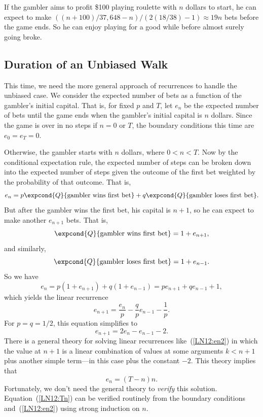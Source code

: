 \begin{example}
\begin{example}
If the gambler aims to profit \$100 playing roulette with $n$ dollars to
start, he can expect to make $((n+100)/37,648 - n)/(2(18/38) - 1) \approx
19n$ bets before the game ends.  So he can enjoy playing for a good while
before almost surely going broke.
\end{example}


\subsection{Duration of an Unbiased Walk}

This time, we need the more general approach of recurrences to handle the
unbiased case.  We consider the expected number of bets as a
function of the gambler's initial capital.  That is, for fixed $p$ and $T$,
let $e_n$ be the expected number of bets until the game ends when the
gambler's initial capital is $n$ dollars.  Since the game is over in no
steps if $n=0$ or $T$, the boundary conditions this time are $e_0=e_T=0$.

Otherwise, the gambler starts with $n$ dollars, where $0 < n < T$.
Now by the conditional expectation rule, the expected number of steps can
be broken down into the expected number of steps given the outcome of the
first bet weighted by the probability of that outcome.  That is,
\[
e_n = p\expcond{Q}{\text{gambler wins first bet}} +
q\expcond{Q}{\text{gambler loses first bet}}.
\]
But after the gambler wins the first bet, his capital is $n+1$, so
he can expect to make another $e_{n+1}$ bets.  That is,
\[
\expcond{Q}{\text{gambler wins first bet}} = 1 + e_{n+1},
\]
and similarly, 
\[
\expcond{Q}{\text{gambler loses first bet}} = 1 + e_{n-1}.
\]
So we have
\[
e_n =  p(1 + e_{n+1}) +  q(1 + e_{n-1}) =  pe_{n+1} + qe_{n-1} + 1, 
\]
which yields the linear recurrence
\[
e_{n+1} = \frac{e_n}{p} - \frac{q}{p} e_{n-1} - \frac{1}{p}.
\]
For $p = q = 1/2$, this equation simplifies to
\begin{equation}\label{LN12:en2}
e_{n+1} = 2e_n - e_{n-1} - 2.
\end{equation}
There is a general theory for solving linear recurrences like~(\ref{LN12:en2})
in which the value at $n+1$ is a linear combination of values at some
arguments $k<n+1$ plus another simple term---in this case plus the constant
$-2$.  This theory implies that
\begin{equation}\label{LN12:Tn}
e_n  = (T - n)n.
\end{equation}
Fortunately, we don't need the general theory to \emph{verify} this
solution.  Equation~(\ref{LN12:Tn}) can be verified routinely from the boundary
conditions and~(\ref{LN12:en2}) using strong induction on $n$.


\end{example}
